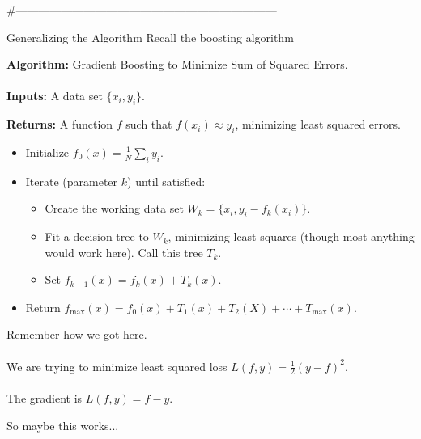 #---------------------------------------------------------------------


\begin{frame}{Generalizing the Algorithm}
Recall the boosting algorithm

\textbf{Algorithm:} Gradient Boosting to Minimize Sum of Squared Errors.\\~\\

\textbf{Inputs:} A data set $\{ x_i, y_i \}$.

\textbf{Returns:} A function $f$ such that $f(x_i) \approx y_i$, minimizing least squared errors.

\begin{itemize}
  \item Initialize $f_0(x) = \frac{1}{N} \sum_i y_i$.
  \item Iterate (parameter $k$) until satisfied: \begin{itemize}
    \item Create the working data set $W_k = \{ x_i, y_i - f_k(x_i) \}$.
    \item Fit a decision tree to $W_k$, minimizing least squares (though most anything would work here).  Call this tree $T_k$.
    \item Set $f_{k+1}(x) = f_{k}(x) + T_{k}(x)$. 
  \end{itemize}
  \item Return $f_{\text{max}}(x) = f_0(x) + T_1(x) + T_2(X) + \cdots + T_{\text{max}}(x)$.
\end{itemize}
\end{frame}
%
\begin{frame}

Remember how we got here. \\~\\

We are trying to minimize least squared loss $L(f, y) = \frac{1}{2}(y - f)^2$.\\~\\

The gradient is $L(f, y) = f - y$.
\end{frame}
%
\begin{frame}
So maybe this works...
\end{frame}
%
